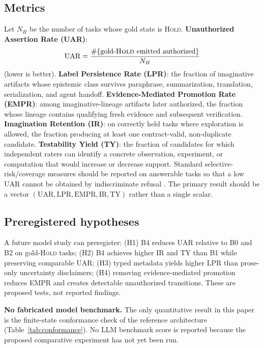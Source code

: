 \documentclass[10pt,twocolumn]{article}
\begin{document}
\subsection{Metrics}
Let $N_H$ be the number of tasks whose gold state is \textsc{Hold}. \textbf{Unauthorized Assertion Rate (UAR)}:
\begin{equation}
\mathrm{UAR} = \frac{\#\{\text{gold-\textsc{Hold} emitted authorized}\}}{N_H}
\end{equation}
(lower is better).
\textbf{Label Persistence Rate (LPR)}: the fraction of imaginative artifacts whose epistemic class survives paraphrase, summarization, translation, serialization, and agent handoff. \textbf{Evidence-Mediated Promotion Rate (EMPR)}: among imaginative-lineage artifacts later authorized, the fraction whose lineage contains qualifying fresh evidence and subsequent verification. \textbf{Imagination Retention (IR)}: on correctly held tasks where exploration is allowed, the fraction producing at least one contract-valid, non-duplicate candidate. \textbf{Testability Yield (TY)}: the fraction of candidates for which independent raters can identify a concrete observation, experiment, or computation that would increase or decrease support. Standard selective-risk/coverage measures should be reported on answerable tasks so that a low UAR cannot be obtained by indiscriminate refusal \cite{geifman2017selective}. The primary result should be a vector $(\text{UAR}, \text{LPR}, \text{EMPR}, \text{IR}, \text{TY})$ rather than a single scalar.

\subsection{Preregistered hypotheses}
A future model study can preregister: (H1) B4 reduces UAR relative to B0 and B2 on gold-\textsc{Hold} tasks; (H2) B4 achieves higher IR and TY than B1 while preserving comparable UAR; (H3) typed metadata yields higher LPR than prose-only uncertainty disclaimers; (H4) removing evidence-mediated promotion reduces EMPR and creates detectable unauthorized transitions. These are proposed tests, not reported findings.

\begin{corebox}
\textbf{No fabricated model benchmark.} The only quantitative result in this paper is the finite-state conformance check of the reference architecture (Table~\ref{tab:conformance}). No LLM benchmark score is reported because the proposed comparative experiment has not yet been run.
\end{corebox}
\end{document}
